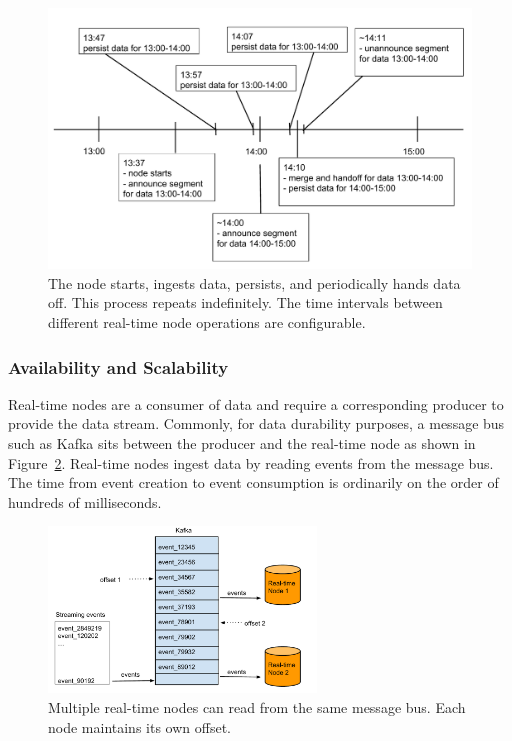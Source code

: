 \documentclass{acm_proc_article-sp}
\begin{document}
\begin{figure}
\centering
\includegraphics[width = 4.5in]{realtime_timeline}
\caption{The node starts, ingests data, persists, and periodically hands data
off. This process repeats indefinitely. The time intervals between different
real-time node operations are configurable.}
\label{fig:realtime_timeline}
\end{figure}

\subsubsection{Availability and Scalability}
Real-time nodes are a consumer of data and require a corresponding producer to
provide the data stream.  Commonly, for data durability purposes, a message
bus such as Kafka \cite{kreps2011kafka} sits between the producer and the
real-time node as shown in Figure~\ref{fig:realtime_pipeline}. Real-time nodes
ingest data by reading events from the message bus. The time from event
creation to event consumption is ordinarily on the order of hundreds of
milliseconds.

\begin{figure}
\centering
\includegraphics[width = 2.8in]{realtime_pipeline}
\caption{Multiple real-time nodes can read from the same message bus. Each node maintains its own offset.}
\label{fig:realtime_pipeline}
\end{figure}
\end{document}
